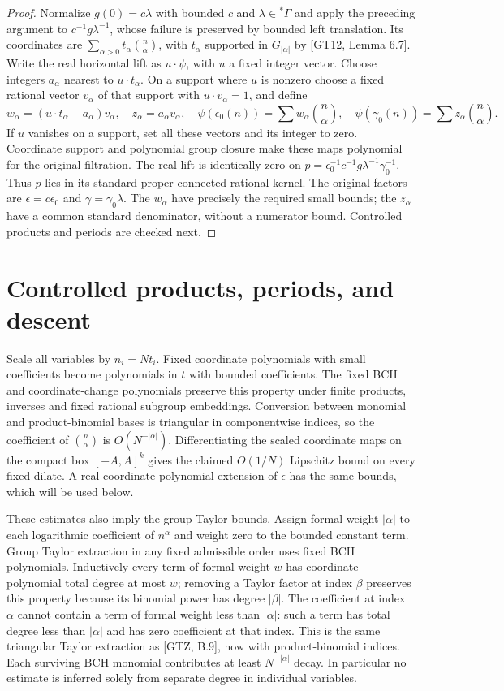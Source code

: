 \documentclass[11pt]{article}
\begin{document}
\begin{proof}
Normalize $g(0)=c\lambda$ with bounded $c$ and $\lambda\in{}^*\Gamma$
and apply the preceding argument to $c^{-1}g\lambda^{-1}$, whose failure
is preserved by bounded left translation. Its coordinates are
$\sum_{\alpha>0}t_\alpha\binom n\alpha$, with $t_\alpha$ supported in
$G_{|\alpha|}$ by [GT12, Lemma 6.7]. Write the real horizontal lift as
$u\cdot\psi$, with $u$ a fixed integer vector.
Choose integers $a_\alpha$ nearest to $u\cdot t_\alpha$.
On a support where $u$ is nonzero choose a fixed rational vector
$v_\alpha$ of that support with $u\cdot v_\alpha=1$, and define
\[
 w_\alpha=(u\cdot t_\alpha-a_\alpha)v_\alpha,
 \quad z_\alpha=a_\alpha v_\alpha,
 \quad \psi(\epsilon_0(n))=\sum w_\alpha\binom n\alpha,
 \quad \psi(\gamma_0(n))=\sum z_\alpha\binom n\alpha.           \tag{6}
\]
If $u$ vanishes on a support, set all these vectors and its integer to zero.
Coordinate support and polynomial group closure make these maps polynomial
for the original filtration. The real lift is identically zero on
$p=\epsilon_0^{-1}c^{-1}g\lambda^{-1}\gamma_0^{-1}$.
Thus $p$ lies in its standard proper connected rational kernel.
The original factors are $\epsilon=c\epsilon_0$ and
$\gamma=\gamma_0\lambda$. The $w_\alpha$ have precisely the required
small bounds; the $z_\alpha$ have a common standard denominator, without
a numerator bound. Controlled products and periods are checked next.
\end{proof}

\section{Controlled products, periods, and descent}
Scale all variables by $n_i=Nt_i$. Fixed coordinate polynomials with small
coefficients become polynomials in $t$ with bounded coefficients. The
fixed BCH and coordinate-change polynomials preserve this property under
finite products, inverses and fixed rational subgroup embeddings.
Conversion between monomial and product-binomial bases is triangular in
componentwise indices, so the coefficient of $\binom n\alpha$ is
$O(N^{-|\alpha|})$. Differentiating the scaled coordinate maps on the
compact box $[-A,A]^k$ gives the claimed $O(1/N)$ Lipschitz bound on every
fixed dilate. A real-coordinate polynomial extension of $\epsilon$ has the
same bounds, which will be used below.

These estimates also imply the group Taylor bounds. Assign formal weight
$|\alpha|$ to each logarithmic coefficient of $n^\alpha$ and weight zero to
the bounded constant term. Group Taylor extraction in any fixed admissible
order uses fixed BCH polynomials. Inductively every term of formal weight
$w$ has coordinate polynomial total degree at most $w$; removing a Taylor
factor at index $\beta$ preserves this property because its binomial power
has degree $|\beta|$. The coefficient at index $\alpha$ cannot contain a
term of formal weight less than $|\alpha|$: such a term has total degree
less than $|\alpha|$ and has zero coefficient at that index. This is the
same triangular Taylor extraction as [GTZ, B.9], now with product-binomial
indices. Each surviving BCH monomial contributes at least
$N^{-|\alpha|}$ decay. In particular no estimate is inferred solely from
separate degree in individual variables.
\end{document}
